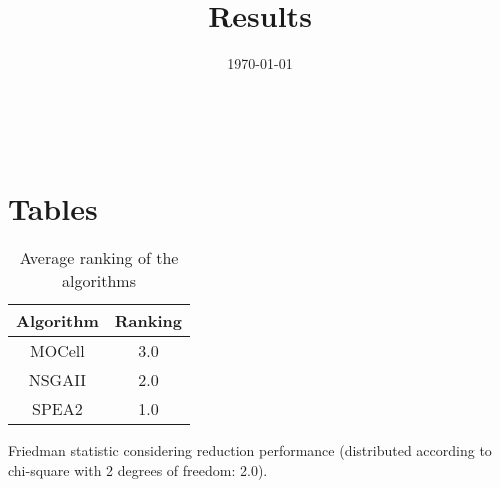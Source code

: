 \documentclass{article}
\title{Results}
\author{}
\date{\today}
\begin{document}
\oddsidemargin 0in \topmargin 0in\maketitle
\
\section{Tables}
\begin{table}[!htp]
\centering
\caption{Average ranking of the algorithms}
\begin{tabular}{c|c}
Algorithm&Ranking\\
\hline
MOCell&3.0\\
NSGAII&2.0\\
SPEA2&1.0\\
\end{tabular}
\end{table}


Friedman statistic considering reduction performance (distributed according to chi-square with 2 degrees of freedom: 2.0).
\end{document}
